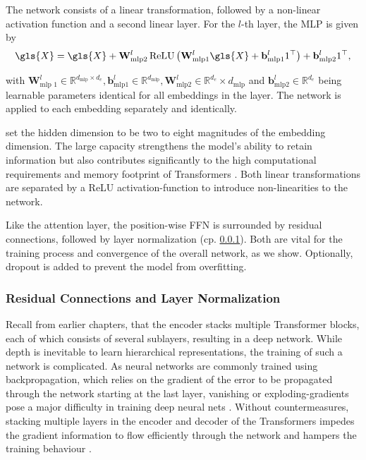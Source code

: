 The network consists of a linear transformation, followed by a non-linear activation function and a second linear layer. For the $l$-th layer, the \gls{MLP} is given by
\begin{equation}
    \gls{X} = \gls{X}+\mathbf{W}_{\mathrm{mlp} 2}^l \operatorname{ReLU}\left(\mathbf{W}_{\mathrm{mlp} 1}^l \gls{X}+\mathbf{b}_{\mathrm{mlp} 1}^l 1^{\top}\right)+\mathbf{b}_{\mathrm{mlp} 2}^l 1^{\top},
\end{equation}

with $\mathbf{W}_{\text {mlp } 1}^l \in \mathbb{R}^{d_{\mathrm{mlp}} \times d_{e}}, \mathbf{b}_{\mathrm{mlp} 1}^l \in \mathbb{R}^{d_{\mathrm{mlp}}}, \mathbf{W}_{\mathrm{mlp} 2}^l \in \mathbb{R}^{d_{e}} \times d_{\mathrm{mlp}}$ and $\mathbf{b}_{\mathrm{mlp} 2}^l \in \mathbb{R}^{d_{e}}$ being learnable parameters identical for all \glspl{embedding} in the layer. The network is applied to each embedding separately and identically.

\textcite[][9]{vaswaniAttentionAllYou2017} set the hidden dimension to be two to eight magnitudes of the embedding dimension. The large capacity strengthens the model's ability to retain information but also contributes significantly to the high computational requirements and memory footprint of Transformers \autocites[][5]{tayEfficientTransformersSurvey2022}[][1]{kitaevReformerEfficientTransformer2020}. Both linear transformations are separated by a \gls{ReLU} \gls{activation-function} \autocite[][318]{glorotDeepSparseRectifier2011} to introduce non-linearities to the network.

Like the attention layer, the position-wise \gls{FFN} is surrounded by residual connections, followed by layer normalization (cp. \cref{sec:residual-connections-layer-norm}). Both are vital for the training process and convergence of the overall network, as we show. Optionally, dropout \autocite[][1930]{srivastavaDropoutSimpleWay} is added to prevent the model from \gls{overfitting}.

\subsubsection{Residual Connections and Layer Normalization}\label{sec:residual-connections-layer-norm}

Recall from earlier chapters, that the encoder stacks multiple Transformer blocks, each of which consists of several sublayers, resulting in a deep network. While depth is inevitable to learn hierarchical representations, the training of such a network is complicated. As neural networks are commonly trained using backpropagation, which relies on the gradient of the error to be propagated through the network starting at the last layer, vanishing or \glspl{exploding-gradient} pose a major difficulty in training deep neural nets \autocite[][1]{heDeepResidualLearning2015}. Without countermeasures, stacking multiple layers in the encoder and decoder of the Transformers impedes the gradient information to flow efficiently through the network and hampers the training behaviour \autocite[][1811]{wangLearningDeepTransformer2019}.

